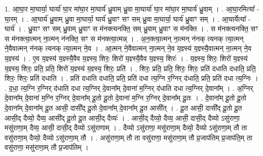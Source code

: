 \documentclass[17pt]{extarticle}
\begin{document}
1. आ॒घा॒र मा॒घार्या॒ घार्या॑ घा॒र मा॑घा॒र मा॒घार्य॑ ध्रु॒वाम् ध्रु॒वा मा॒घार्या॑ घा॒र मा॑घा॒र मा॒घार्य॑ ध्रु॒वाम् । . आ॒घा॒रमित्या᳚ - घा॒रम् । . आ॒घार्य॑ ध्रु॒वाम् ध्रु॒वा मा॒घार्या॒ घार्य॑ ध्रु॒वाꣳ सꣳ सम् ध्रु॒वा मा॒घार्या॒ घार्य॑ ध्रु॒वाꣳ सम् । . आ॒घार्येत्या᳚ - घार्य॑ । . ध्रु॒वाꣳ सꣳ सम् ध्रु॒वाम् ध्रु॒वाꣳ स म॑नक्त्यनक्ति॒ सम् ध्रु॒वाम् ध्रु॒वाꣳ स म॑नक्ति । . स म॑नक्त्यनक्ति॒ सꣳ स म॑नक्त्या॒त्मन् ना॒त्मन् न॑नक्ति॒ सꣳ स म॑नक्त्या॒त्मन्न् । . अ॒न॒क्त्या॒त्मन् ना॒त्मन् न॑नक् त्यनक् त्या॒त्मन् ने॒वैवात्मन् न॑नक् त्यनक् त्या॒त्मन् ने॒व । . आ॒त्मन् ने॒वैवात्मन् ना॒त्मन् ने॒व य॒ज्ञ्स्य॑ य॒ज्ञ्स्यै॒वात्मन् ना॒त्मन् ने॒व य॒ज्ञ्स्य॑ । . ए॒व य॒ज्ञ्स्य॑ य॒ज्ञ्स्यै॒वैव य॒ज्ञ्स्य॒ शिरः॒ शिरो॑ य॒ज्ञ्स्यै॒वैव य॒ज्ञ्स्य॒ शिरः॑ । . य॒ज्ञ्स्य॒ शिरः॒ शिरो॑ य॒ज्ञ्स्य॑ य॒ज्ञ्स्य॒ शिरः॒ प्रति॒ प्रति॒ शिरो॑ य॒ज्ञ्स्य॑ य॒ज्ञ्स्य॒ शिरः॒ प्रति॑ । . शिरः॒ प्रति॒ प्रति॒ शिरः॒ शिरः॒ प्रति॑ दधाति दधाति॒ प्रति॒ शिरः॒ शिरः॒ प्रति॑ दधाति । . प्रति॑ दधाति दधाति॒ प्रति॒ प्रति॑ दधा त्य॒ग्नि र॒ग्निर् द॑धाति॒ प्रति॒ प्रति॑ दधा त्य॒ग्निः । . द॒धा॒ त्य॒ग्नि र॒ग्निर् द॑धाति दधा त्य॒ग्निर् दे॒वाना᳚म् दे॒वाना॑ म॒ग्निर् द॑धाति दधा त्य॒ग्निर् दे॒वाना᳚म् । . अ॒ग्निर् दे॒वाना᳚म् दे॒वाना॑ म॒ग्नि र॒ग्निर् दे॒वाना᳚म् दू॒तो दू॒तो दे॒वाना॑ म॒ग्नि र॒ग्निर् दे॒वाना᳚म् दू॒तः । . दे॒वाना᳚म् दू॒तो दू॒तो दे॒वाना᳚म् दे॒वाना᳚म् दू॒त आसी॒ दासी᳚द् दू॒तो दे॒वाना᳚म् दे॒वाना᳚म् दू॒त आसी᳚त् । . दू॒त आसी॒ दासी᳚द् दू॒तो दू॒त आसी॒द् दैव्यो॒ दैव्य॒ आसी᳚द् दू॒तो दू॒त आसी॒द् दैव्यः॑ । . आसी॒द् दैव्यो॒ दैव्य॒ आसी॒ दासी॒द् दैव्यो ऽसु॑राणा॒ मसु॑राणा॒म् दैव्य॒ आसी॒ दासी॒द् दैव्यो ऽसु॑राणाम् । . दैव्यो ऽसु॑राणा॒ मसु॑राणा॒म् दैव्यो॒ दैव्यो ऽसु॑राणा॒म् तौ ता वसु॑राणा॒म् दैव्यो॒ दैव्यो ऽसु॑राणा॒म् तौ । . असु॑राणा॒म् तौ ता वसु॑राणा॒ मसु॑राणा॒म् तौ प्र॒जाप॑तिम् प्र॒जाप॑ति॒म् ता वसु॑राणा॒ मसु॑राणा॒म् तौ प्र॒जाप॑तिम् । \newline
\end{document}
